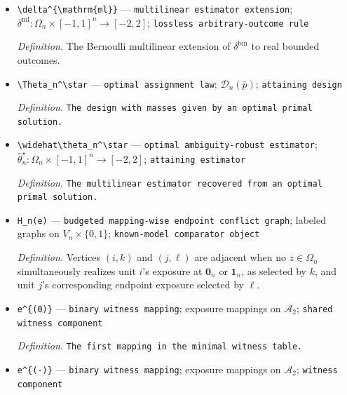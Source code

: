 \documentclass{article}
\begin{document}
\begin{itemize}
  \par\smallskip\noindent\emph{Definition.} \texttt{The finite estimator recovered from a primal solution.}
  \item \texttt{\textbackslash{}\allowbreak{}delta\textasciicircum{}\{\textbackslash{}\allowbreak{}mathrm\{ml\}\allowbreak{}\}\allowbreak{}} --- \texttt{multilinear estimator extension}; \(\delta^{\mathrm{ml}}:\Omega_n\times[-1,1]^n\to[-2,2]\); \texttt{lossless arbitrary-\allowbreak{}outcome rule}
  \par\smallskip\noindent\emph{Definition.} The Bernoulli multilinear extension of \(\delta^{\mathrm{bin}}\) to real bounded outcomes.
  \item \texttt{\textbackslash{}\allowbreak{}Theta\_\allowbreak{}n\textasciicircum{}\textbackslash{}\allowbreak{}star} --- \texttt{optimal assignment law}; \(\mathcal D_n(\bar p)\); \texttt{attaining design}
  \par\smallskip\noindent\emph{Definition.} \texttt{The design with masses given by an optimal primal solution.}
  \item \texttt{\textbackslash{}\allowbreak{}widehat\textbackslash{}\allowbreak{}theta\_\allowbreak{}n\textasciicircum{}\textbackslash{}\allowbreak{}star} --- \texttt{optimal ambiguity-\allowbreak{}robust estimator}; \(\widehat\theta_n^\star:\Omega_n\times[-1,1]^n\to[-2,2]\); \texttt{attaining estimator}
  \par\smallskip\noindent\emph{Definition.} \texttt{The multilinear estimator recovered from an optimal primal solution.}
  \item \texttt{H\_\allowbreak{}n(e)} --- \texttt{budgeted mapping-\allowbreak{}wise endpoint conflict graph}; labeled graphs on \(V_n\times\{0,1\}\); \texttt{known-\allowbreak{}model comparator object}
  \par\smallskip\noindent\emph{Definition.} Vertices \((i,k)\) and \((j,\ell)\) are adjacent when no \(z\in\Omega_n\) simultaneously realizes unit \(i\)'s exposure at \(\mathbf 0_n\) or \(\mathbf 1_n\), as selected by \(k\), and unit \(j\)'s corresponding endpoint exposure selected by \(\ell\).
  \item \texttt{e\textasciicircum{}\{(0)\}\allowbreak{}} --- \texttt{binary witness mapping}; exposure mappings on \(\mathcal A_2\); \texttt{shared witness component}
  \par\smallskip\noindent\emph{Definition.} \texttt{The first mapping in the minimal witness table.}
  \item \texttt{e\textasciicircum{}\{(-\allowbreak{})\}\allowbreak{}} --- \texttt{binary witness mapping}; exposure mappings on \(\mathcal A_2\); \texttt{witness component}

\end{itemize}
\end{document}

